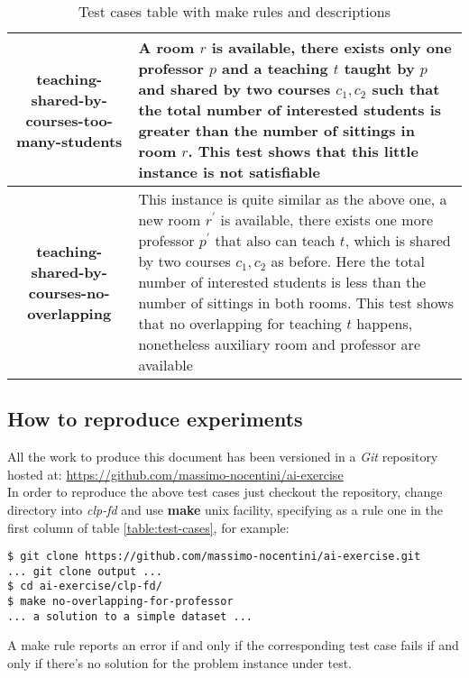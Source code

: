 \documentclass[10pt,a4paper]{article} %
\begin{document}
\begin{table}
\begin{tabular}{ c | p{6cm} }
            \hline
            \textbf{teaching-shared-by-courses-too-many-students} &
                A room $r$ is available,
                there exists only one professor $p$ and a teaching $t$ taught by $p$
                and shared by two courses $c_1, c_2$ such that the total number
                of interested students is greater than the number of sittings in
                room $r$.
                This test shows that this little instance is not satisfiable \\
            \hline
            \textbf{teaching-shared-by-courses-no-overlapping} &
                This instance is quite similar as the above one, a new
                room $r^\prime$ is available, there exists one more professor
                $p^\prime$ that also can teach $t$, which is shared by two
                courses $c_1, c_2$ as before. Here the total number
                of interested students is less than the number of sittings in
                both rooms. This test shows that no overlapping for teaching $t$
                happens, nonetheless auxiliary room and professor are available \\
            \end{tabular}

        \caption{Test cases table with make rules and descriptions}
    \end{table}

    \subsection{How to reproduce experiments}
    All the work to produce this document has been versioned in a
    \emph{Git} repository hosted at:
    \url{https://github.com/massimo-nocentini/ai-exercise}\\
    In order to reproduce the above test cases just checkout the
    repository, change directory into \emph{clp-fd} and use \textbf{make}
    unix facility, specifying as a rule one in the first column of table
    \ref{table:test-cases}, for example:
    \begin{verbatim}
$ git clone https://github.com/massimo-nocentini/ai-exercise.git
... git clone output ...
$ cd ai-exercise/clp-fd/
$ make no-overlapping-for-professor
... a solution to a simple dataset ...
    \end{verbatim}
    A make rule reports an error if and only if the corresponding
    test case fails if and only if there's no solution for the
    problem instance under test.
\end{document}
